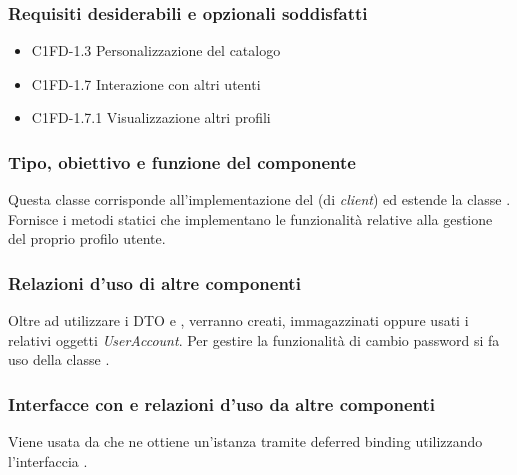 \subsubsection*{Requisiti desiderabili e opzionali soddisfatti}
\begin{itemize}
    \item C1FD-1.3 Personalizzazione del catalogo
    \item C1FD-1.7 Interazione con altri utenti
    \item C1FD-1.7.1 Visualizzazione altri profili
\end{itemize}
\subsubsection*{Tipo, obiettivo e funzione del componente}
Questa classe corrisponde all'implementazione del  (di
\emph{client}) ed estende la classe . Fornisce i metodi
statici che implementano le funzionalit\`a relative alla gestione del proprio
profilo utente.  
\subsubsection*{Relazioni d'uso di altre componenti} Oltre ad
utilizzare i DTO  e , verranno creati,
immagazzinati oppure usati i relativi oggetti \emph{UserAccount}. Per gestire la
funzionalit\`a di cambio password si fa uso della classe .
\subsubsection*{Interfacce con e relazioni d'uso da altre componenti} Viene
usata da  che ne ottiene un'istanza tramite deferred
binding utilizzando l'interfaccia .
